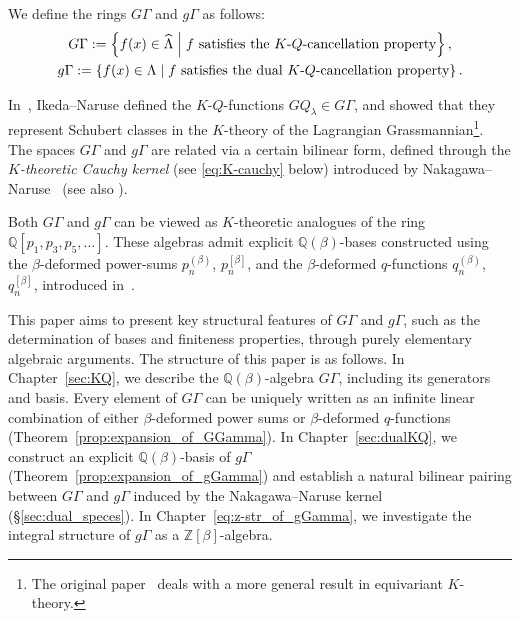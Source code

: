 \documentclass[dvipdfmx]{amsart}
\theoremstyle{definition}
\theoremstyle{remark}
\begin{document}
We define the rings \( G\Gamma \) and \( g\Gamma \) as follows:
\[
\begin{gathered}
G\Gamma := \left\{
f(x) \in \widehat{\Lambda} \;\middle|\;
\text{\( f \) satisfies the \( K \)-\( Q \)-cancellation property}
\right\}, \\
g\Gamma := \left\{
f(x) \in \Lambda \;\middle|\;
\text{\( f \) satisfies the dual \( K \)-\( Q \)-cancellation property}
\right\}.
\end{gathered}
\]

In~\cite{IKEDA201322}, Ikeda–Naruse defined the \( K \)-\( Q \)-functions \( GQ_\lambda \in G\Gamma \), and showed that they represent Schubert classes in the \( K \)-theory of the Lagrangian Grassmannian\footnote{The original paper~\cite{IKEDA201322} deals with a more general result in equivariant \( K \)-theory.}. 
The spaces $G\Gamma$ and $g\Gamma$ are related via a certain bilinear form, defined through the \textit{$K$-theoretic Cauchy kernel} (see \eqref{eq:K-cauchy} below) introduced by Nakagawa–Naruse~\cite[Definition 5.3]{nakagawa2016generating} (see also \cite[Definition 6.2]{nakagawa2017generating}).

Both \( G\Gamma \) and \( g\Gamma \) can be viewed as \( K \)-theoretic analogues of the ring \( \mathbb{Q}[p_1, p_3, p_5, \dots] \). These algebras admit explicit \( \mathbb{Q}(\beta) \)-bases constructed using the \(\beta\)-deformed power-sums \( p^{(\beta)}_n \), \( p^{[\beta]}_n \), and the \(\beta\)-deformed \( q \)-functions \( q^{(\beta)}_n \), \( q^{[\beta]}_n \), introduced in~\cite{iwao2022}.

This paper aims to present key structural features of \( G\Gamma \) and \( g\Gamma \), such as the determination of bases and finiteness properties, through purely elementary algebraic arguments.
The structure of this paper is as follows.
In Chapter~\ref{sec:KQ}, we describe the \( \mathbb{Q}(\beta) \)-algebra \( G\Gamma \), including its generators and basis. Every element of \( G\Gamma \) can be uniquely written as an infinite linear combination of either \(\beta\)-deformed power sums or \(\beta\)-deformed \( q \)-functions (Theorem~\ref{prop:expansion_of_GGamma}).
In Chapter~\ref{sec:dualKQ}, we construct an explicit \( \mathbb{Q}(\beta) \)-basis of \( g\Gamma \) (Theorem~\ref{prop:expansion_of_gGamma}) and establish a natural bilinear pairing between \( G\Gamma \) and \( g\Gamma \) induced by the Nakagawa–Naruse kernel (\S\ref{sec:dual_speces}).
In Chapter~\ref{eq:z-str_of_gGamma}, we investigate the integral structure of \( g\Gamma \) as a \( \mathbb{Z}[\beta] \)-algebra.
\end{document}
